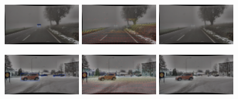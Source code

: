 \documentclass[report.tex]{subfiles}
\begin{document}
\begin{figure}[ht!]
            \includegraphics[width=0.3\textwidth]{images/datasets/dense/samples/dense_fog/2018-10-29_15-02-37_00580.png}\hfill
            \includegraphics[width=0.3\textwidth]{images/datasets/dense/samples/dense_fog/dense_lidar.png}\hfill
            \includegraphics[width=0.3\textwidth]{images/datasets/dense/samples/dense_fog/dense_radar.png}
          
            \includegraphics[width=0.3\textwidth]{images/datasets/dense/samples/snow/2018-02-07_11-56-57_00520.png}\hfill
            \includegraphics[width=0.3\textwidth]{images/datasets/dense/samples/snow/snow_lidar.png}\hfill
            \includegraphics[width=0.3\textwidth]{images/datasets/dense/samples/snow/snow_radar.png}
          

\end{figure}
\end{document}
